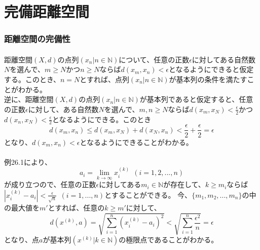 \documentclass{jsarticle}
\begin{document}
\part{完備距離空間}
\section{距離空間の完備性}


\subsection{}
距離空間$(X,d)$の点列$(x_n|n\in\mathbb{N})$について、任意の正数$\epsilon$に対してある自然数$N$を選んで、$m\geq N$かつ$n\geq N$ならば$d(x_m,x_n)<\epsilon$となるようにできると仮定する。このとき、$n=N$とすれば、点列$(x_n|n\in\mathbb{N})$が基本列の条件を満たすことがわかる。\\
逆に、距離空間$(X,d)$の点列$(x_n|n\in\mathbb{N})$が基本列であると仮定すると、任意の正数$\epsilon$に対して、ある自然数$N$を選んで、$m,n\geq N$ならば$d(x_m,x_N)<\frac{\epsilon}{2}$かつ$d(x_n,x_N)<\frac{\epsilon}{2}$となるようにできる。このとき
\[d(x_m,x_n)\leq d(x_m,x_N)+d(x_N,x_n)<\frac{\epsilon}{2}+\frac{\epsilon}{2}=\epsilon\]
となり、$d(x_m,x_n)<\epsilon$となるようにできることがわかる。


\subsection{}
例26.1により、
\[a_i=\lim_{k\to\infty}x_i^{(k)}\ \ (i=1,2,...,n)\]
が成り立つので、任意の正数$\epsilon$に対してある$m_i\in\mathbb{N}$が存在して、$k\geq m_i$ならば$|x_i^{(k)}-a_i|<\frac{\epsilon}{\sqrt{n}}\ \ (i=1,...,n)$とすることができる。
今、$\{m_1,m_2,...,m_n\}$の中の最大値を$m'$とすれば、任意の$k\geq m'$に対して、
\[d(x^{(k)},a)=\sqrt{\sum_{i=1}^n(x_i^{(k)}-a_i)^2}<\sqrt{\sum_{i=1}^n \frac{\epsilon^2}{n}}=\epsilon\]
となり、点$a$が基本列$(x^{(k)}|k\in\mathbb{N})$の極限点であることがわかる。



\end{document}
